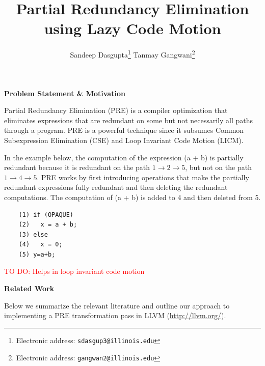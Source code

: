 \documentclass[10pt,twoside]{report}
\title{\textbf{Partial Redundancy Elimination using Lazy Code Motion}}
\author{Sandeep Dasgupta\thanks{Electronic address:
\texttt{sdasgup3@illinois.edu}} \qquad Tanmay Gangwani\thanks{Electronic
address: \texttt{gangwan2@illinois.edu}}}
\begin{document}
\begin{titlepage}
\thispagestyle{empty}
\maketitle
\pagebreak
\end{titlepage}

\begin{flushleft}
\textbf{\Large{Problem Statement \& Motivation}}
\end{flushleft}
Partial Redundancy Elimination (PRE) is a compiler optimization that eliminates
expressions that are redundant on some but not necessarily all paths through a
program. PRE is a powerful technique since it subsumes Common Subexpression
Elimination (CSE) and Loop Invariant Code Motion (LICM).

In the example below, the computation of the expression (a + b) is partially
redundant because it is redundant on the path $1 \rightarrow 2 \rightarrow 5$,
          but not on the path $1 \rightarrow 4 \rightarrow 5$. PRE works by first introducing
          operations that make the partially redundant expressions fully
          redundant and then deleting the redundant computations. The
          computation of (a + b) is added to 4 and then deleted from 5.


\lstset{ %
  basicstyle=\footnotesize, 
  breakatwhitespace=false,   
  breaklines=true,            
}
\begin{center}
\begin{lstlisting}
    (1) if (OPAQUE)
    (2)   x = a + b;
    (3) else
    (4)   x = 0;
    (5) y=a+b;
\end{lstlisting}
\end{center}

\textcolor{red}{TO DO: Helps in loop invariant code motion}

\begin{flushleft}
\textbf{\Large{Related Work}}
\end{flushleft}
Below we summarize the relevant literature and outline our approach to
implementing a PRE transformation pass in LLVM (\url{http://llvm.org/}).
\end{document}

